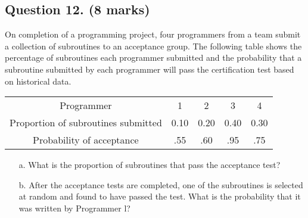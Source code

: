 \documentclass[]{report}
\begin{document}
\subsection*{Question 12. (8 marks) } %
On completion of a programming project, four programmers from a
team submit a collection of subroutines to an acceptance group. The
following table shows the percentage of subroutines each programmer
submitted and the probability that a subroutine submitted by each
programmer will pass the certification test based on historical data.
\begin{center}
	\begin{tabular}{|c|c|c|c|c|}
		\hline
		Programmer & 1 & 2 & 3 & 4 \\
		Proportion of subroutines submitted & 0.10 & 0.20 & 0.40 & 0.30 \\
		Probability of acceptance & .55 & .60 & .95 & .75 \\
		\hline
	\end{tabular}
\end{center}
\begin{itemize}
	\item[a.] What is the proportion of subroutines that pass the acceptance test?
	\item[b.] After the acceptance tests are completed, one of the subroutines is
	selected at random and found to have passed the test. What is the
	probability that it was written by Programmer l?
\end{itemize}






%
%
%
%
%
%
%
%
\end{document}
